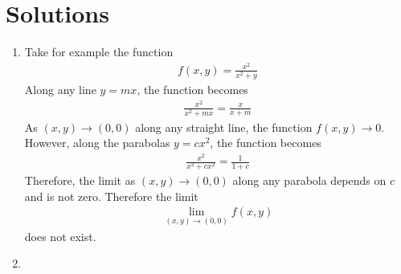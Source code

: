 \documentclass{article}
\begin{document}
\newpage
\section*{Solutions}

\begin{enumerate}
\item 
Take for example the function
\begin{align*}
f(x,y) = \frac{x^2}{x^2+y}
\end{align*}
Along any line $y = mx$, the function becomes
\begin{align*}
\frac{x^2}{x^2+mx} = \frac{x}{x+m}
\end{align*}
As $(x,y) \rightarrow (0,0)$ along any straight line, the function $f(x,y) \rightarrow 0$. However, along the parabolas $y=cx^2$, the function becomes
\begin{align*}
\frac{x^2}{x^2+cx^2} = \frac{1}{1 + c}
\end{align*}
Therefore, the limit as $(x,y) \rightarrow (0,0)$ along any parabola depends on $c$ and is not zero. Therefore the limit 
\begin{align*}
\lim_{(x,y) \rightarrow (0,0)} f(x,y)
\end{align*}
does not exist. 

\item
\begin{enumerate}


\end{enumerate}
\end{enumerate}
\end{document}
